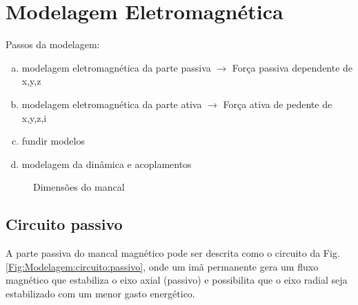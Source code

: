 \pagestyle{empty}
\cleardoublepage
\pagestyle{fancy}

\chapter{Modelagem Eletromagnética}

Passos da modelagem:

\begin{enumerate}[a.]
	\item modelagem eletromagnética da parte passiva $\rightarrow$ Força passiva dependente de x,y,z
	\item modelagem eletromagnética da parte ativa  $\rightarrow$ Força ativa de pedente de x,y,z,i
	\item fundir modelos
	\item modelagem da dinâmica e acoplamentos 
\end{enumerate}


\begin{figure}[!ht]
	\centering
	\def\svgwidth{\columnwidth}
	
		\caption{Dimensões do mancal}
		\label{Fig:Modelagem:Dimensoes}
\end{figure}

\section{Circuito passivo}

A parte passiva do mancal magnético pode ser descrita como o circuito da Fig. \ref{Fig:Modelagem:circuito:passivo}, onde um imã permanente gera um fluxo magnético que estabiliza o eixo axial (passivo) e possibilita que o eixo radial seja estabilizado com um menor gasto energético.

%

%	


